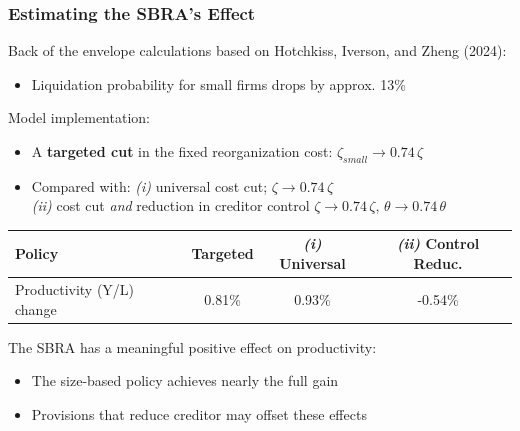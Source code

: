 \documentclass[aspectratio=169,xcolor=table]{beamer}
\begin{document}
\begin{frame}[label=sbra_effect] \frametitle{Estimating the SBRA’s Effect}

Back of the envelope calculations based on Hotchkiss, Iverson, and Zheng (2024): 
\begin{itemize} \small
    \item Liquidation probability for small firms drops by approx. 13\%  \hfill \hyperlink{sbra_data}{} 
\end{itemize} \normalsize

Model implementation:
\begin{itemize}\small
    \item A \textbf{targeted cut} in the fixed reorganization cost: \hspace{1.76cm} $\zeta_{small} \rightarrow 0.74\,\zeta$
    \item Compared with: \textit{(i)} universal cost cut; \hspace{3.3cm} $\zeta \rightarrow 0.74\,\zeta$ \\
    \hspace{2.3cm} \textit{(ii)} cost cut \textit{and} reduction in creditor control  $\zeta \rightarrow 0.74\,\zeta$,   $\theta \rightarrow 0.74\,\theta$  
\end{itemize} \vspace{2mm}

\pause

\small
\begin{table}[H]
    \centering
    \renewcommand{\arraystretch}{0.9}
    \begin{tabular}{lccc}
    \textbf{Policy} &  \textbf{Targeted} & \textit{(i)} \textbf{Universal} & \textit{(ii)} \textbf{Control Reduc.} \\    
    \toprule
    Productivity (Y/L) change & 0.81\%  & 0.93\% & -0.54\%  \\  
    \end{tabular}
    \label{tab:percentage_changes2}
\end{table} \normalsize \vspace{2mm}

The SBRA has a meaningful positive effect on productivity: \hfill \hyperlink{sbra_fullres}{} 
\begin{itemize} \small
    \item The size-based policy achieves nearly the full gain
    \item Provisions that reduce creditor may offset these effects
\end{itemize}

\end{frame}
\end{document}
